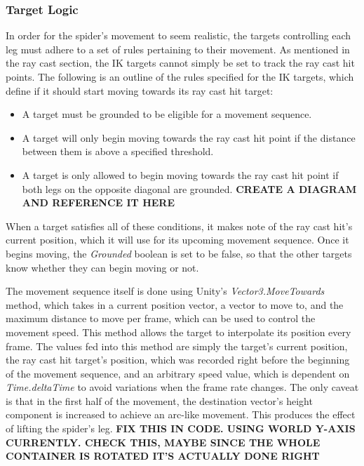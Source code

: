 \subsubsection{Target Logic}
In order for the spider's movement to seem realistic, the targets controlling
each leg must adhere to a set of rules pertaining to their movement. As
mentioned in the ray cast section, the IK targets cannot simply be set to track
the ray cast hit points. The following is an outline of the rules specified for
the IK targets, which define if it should start moving towards its ray cast hit
target:
\begin{itemize}
    \item A target must be grounded to be eligible for a movement sequence.

    \item A target will only begin moving towards the ray cast hit point if the
        distance between them is above a specified threshold.

    \item A target is only allowed to begin moving towards the ray cast hit
        point if both legs on the opposite diagonal are grounded.
        \textbf{CREATE A DIAGRAM AND REFERENCE IT HERE}
\end{itemize}

When a target satisfies all of these conditions, it makes note of the ray cast
hit's current position, which it will use for its upcoming movement sequence.
Once it begins moving, the \textit{Grounded} boolean is set to be false, so that
the other targets know whether they can begin moving or not.

The movement sequence itself is done using Unity's \textit{Vector3.MoveTowards}
method, which takes in a current position vector, a vector to move to, and the
maximum distance to move per frame, which can be used to control the movement
speed. This method allows the target to interpolate its position every frame.
The values fed into this method are simply the target's current position, the
ray cast hit target's position, which was recorded right before the beginning of
the movement sequence, and an arbitrary speed value, which is dependent on
\textit{Time.deltaTime} to avoid variations when the frame rate changes. The
only caveat is that in the first half of the movement, the destination vector's
height component is increased to achieve an arc-like movement. This produces the
effect of lifting the spider's leg. \textbf{FIX THIS IN CODE. USING WORLD Y-AXIS
CURRENTLY. CHECK THIS, MAYBE SINCE THE WHOLE CONTAINER IS ROTATED IT'S ACTUALLY
DONE RIGHT}

